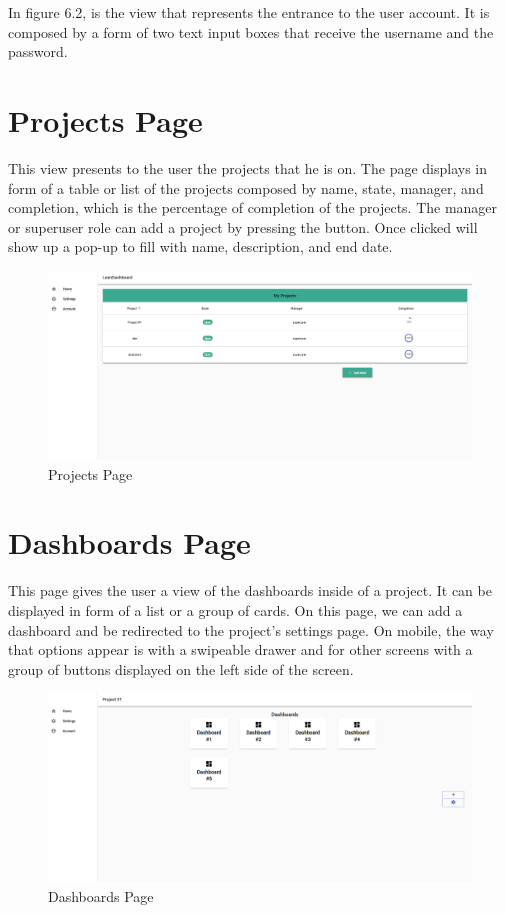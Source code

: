 \documentclass[a4paper,twoside,10pt]{report}
\begin{document}
\newpage 

In figure 6.2, is the view that represents the entrance to the user account. It is composed by a form of two text input boxes that receive the username and the password.

\section{Projects Page}
This view presents to the user the projects that he is on. The page displays in form of a table or list of the projects composed by name, state, manager, and completion, which is the percentage of completion of the projects. The manager or superuser role can add a project by pressing the button. Once clicked will show up a pop-up to fill with name, description, and end date.

\begin{figure}[h!]
\center
    \includegraphics[width=\textwidth]{projectsPage.png}
\caption{Projects Page}
\end{figure}

\section{Dashboards Page}
This page gives the user a view of the dashboards inside of a project. It can be displayed in form of a list or a group of cards. On this page, we can add a dashboard and be redirected to the project's settings page. On mobile, the way that options appear is with a swipeable drawer and for other screens with a group of buttons displayed on the left side of the screen.

\begin{figure}[h!]
\center
    \includegraphics[width=\textwidth]{dashboardsPage.png}
\caption{Dashboards Page}
\end{figure}
\end{document}
